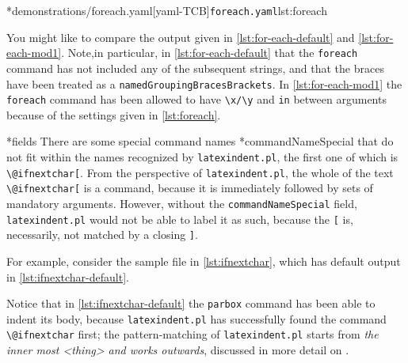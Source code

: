 	\begin{cmhtcbraster}[raster column skip=.1\linewidth]
		\cmhlistingsfromfile[style=yaml-LST]*{demonstrations/foreach.yaml}[yaml-TCB]{\texttt{foreach.yaml}}{lst:foreach}
	\end{cmhtcbraster}

	You might like to compare the output given in \cref{lst:for-each-default} and
	\cref{lst:for-each-mod1}. Note,in particular, in \cref{lst:for-each-default} that the
	\texttt{foreach} command has not included any of the subsequent strings, and that
	the braces have been treated as a \texttt{namedGroupingBracesBrackets}. In \cref{lst:for-each-mod1} the
	\texttt{foreach} command has been allowed to have \lstinline!\x/\y! and
	\texttt{in} between arguments because of the settings given in
	\cref{lst:foreach}.

*{fields}
	There are some special command names%
	*{commandNameSpecial} that do not fit within the names recognized by
	\texttt{latexindent.pl}, the first one of which is \lstinline!\@ifnextchar[!. From the
	perspective of \texttt{latexindent.pl}, the whole of the text \lstinline!\@ifnextchar[! is
	a command, because it is immediately followed by sets of mandatory arguments. However,
	without the \texttt{commandNameSpecial} field, \texttt{latexindent.pl} would not be able to
	label it as such, because the \lstinline![! is, necessarily, not matched by a
	closing \lstinline!]!.

	For example, consider the sample file in \cref{lst:ifnextchar}, which has default
	output in \cref{lst:ifnextchar-default}.

	\begin{cmhtcbraster}[raster column skip=.1\linewidth]
	\end{cmhtcbraster}

	Notice that in \cref{lst:ifnextchar-default} the \texttt{parbox} command has been able
	to indent its body, because \texttt{latexindent.pl} has successfully found the command
	\lstinline!\@ifnextchar! first; the pattern-matching of \texttt{latexindent.pl} starts
	from \emph{the inner most <thing> and works outwards}, discussed in more detail on .

